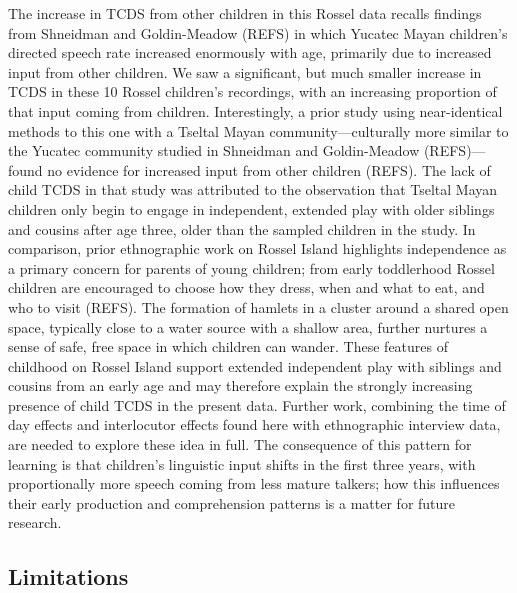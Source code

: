 \documentclass[,man,floatsintext]{apa6}
\begin{document}
The increase in TCDS from other children in this Rossel data recalls
findings from Shneidman and Goldin-Meadow (REFS) in which Yucatec Mayan
children's directed speech rate increased enormously with age, primarily
due to increased input from other children. We saw a significant, but
much smaller increase in TCDS in these 10 Rossel children's recordings,
with an increasing proportion of that input coming from children.
Interestingly, a prior study using near-identical methods to this one
with a Tseltal Mayan community---culturally more similar to the Yucatec
community studied in Shneidman and Goldin-Meadow (REFS)---found no
evidence for increased input from other children (REFS). The lack of
child TCDS in that study was attributed to the observation that Tseltal
Mayan children only begin to engage in independent, extended play with
older siblings and cousins after age three, older than the sampled
children in the study. In comparison, prior ethnographic work on Rossel
Island highlights independence as a primary concern for parents of young
children; from early toddlerhood Rossel children are encouraged to
choose how they dress, when and what to eat, and who to visit (REFS).
The formation of hamlets in a cluster around a shared open space,
typically close to a water source with a shallow area, further nurtures
a sense of safe, free space in which children can wander. These features
of childhood on Rossel Island support extended independent play with
siblings and cousins from an early age and may therefore explain the
strongly increasing presence of child TCDS in the present data. Further
work, combining the time of day effects and interlocutor effects found
here with ethnographic interview data, are needed to explore these idea
in full. The consequence of this pattern for learning is that children's
linguistic input shifts in the first three years, with proportionally
more speech coming from less mature talkers; how this influences their
early production and comprehension patterns is a matter for future
research.

\subsection{Limitations}\label{limitations}
\end{document}
